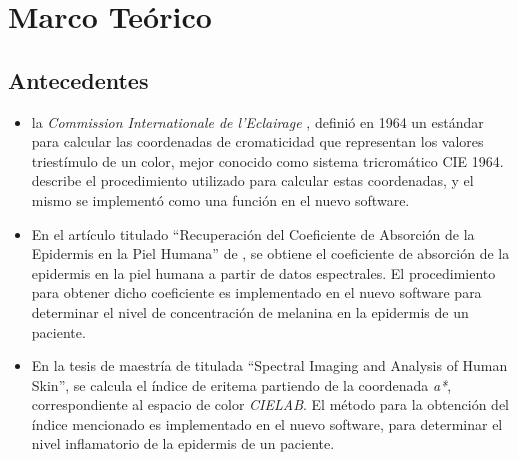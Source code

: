 \chapter{\label{cap:2}Marco Te\'{o}rico}

	\section{Antecedentes}	
		\begin{itemize}
		
			\item
				la \textit{\mbox{Commission} Internationale de l'Eclairage} \cite{CIE}, defini\'{o} en 1964 un est\'{a}ndar para calcular las coordenadas de cromaticidad que representan los valores triest\'{i}mulo de un color, mejor conocido como sistema tricrom\'{a}tico CIE 1964. \cite{Schanda} describe el procedimiento utilizado para calcular estas coordenadas, y el mismo se implement\'{o} como una funci\'{o}n en el nuevo software.	
			
			\item En el art\'{i}culo titulado ``Recuperaci\'{o}n del Coeficiente de Absorci\'{o}n de la Epidermis en la Piel Humana'' de \cite{Narea}, se obtiene el coeficiente de absorci\'{o}n de la epidermis en la piel humana a partir de datos espectrales. El procedimiento para obtener dicho coeficiente es implementado en el nuevo software para determinar el nivel de concentraci\'{o}n de melanina en la epidermis de un paciente.
			
			\item En la tesis de maestr\'{i}a de \cite{Bersha} titulada ``Spectral Imaging and Analysis of Human Skin'', se calcula el \'{i}ndice de eritema partiendo de la coordenada \textit{a*}, correspondiente al espacio de color \textit{CIELAB}. El m\'{e}todo para la obtenci\'{o}n del \'{i}ndice mencionado es implementado en el nuevo software, para determinar el nivel inflamatorio de la epidermis de un paciente.
		\end{itemize}

